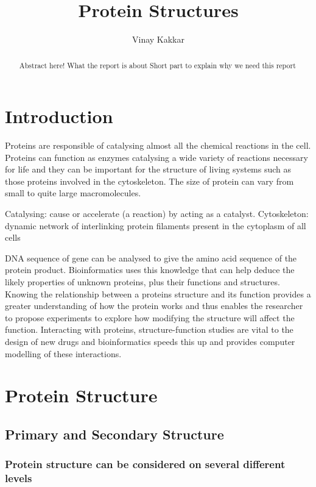 \documentclass{article}
\title{Protein Structures}
\author{Vinay Kakkar}
\begin{document}
\maketitle

\begin{abstract}
Abstract here!
What the report is about
Short part to explain why we need this report
\end{abstract}

\section{Introduction}

Proteins are responsible of catalysing almost all the chemical reactions in the cell. Proteins can function as enzymes catalysing a wide variety of reactions necessary for life and they can be important for the structure of living systems such as those proteins involved in the cytoskeleton. The size of protein can vary from small to quite large macromolecules.

Catalysing: cause or accelerate (a reaction) by acting as a catalyst.
Cytoskeleton: dynamic network of interlinking protein filaments present in the cytoplasm of all cells

DNA sequence of gene can be analysed to give the amino acid sequence of the protein product. Bioinformatics uses this knowledge that can help deduce the likely properties of unknown proteins, plus their functions and structures. Knowing the relationship between a proteins structure and its function provides a greater understanding of how the protein works and thus enables the researcher to propose experiments to explore how modifying the structure will affect the function. Interacting with proteins, structure-function studies are vital to the design of new drugs and bioinformatics speeds this up and provides computer modelling of these interactions.


\section{Protein Structure}

\subsection{Primary and Secondary Structure}

\subsubsection{Protein structure can be considered on several different levels}
\end{document}
